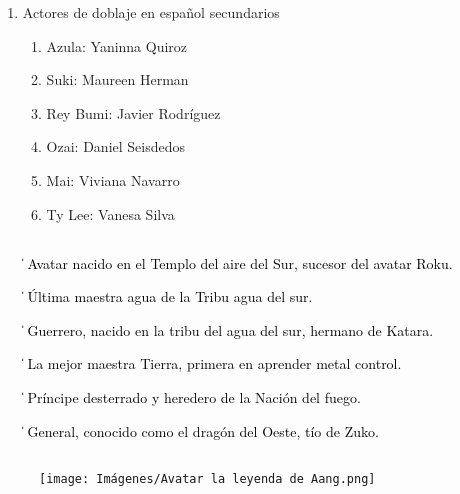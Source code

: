 \documentclass[a5paper,11pt]{article}
\begin{document}
{\begin{enumerate}
\begin{enumerate}
            \end{enumerate}
        \item Actores de doblaje en español secundarios
        \begin{enumerate}
            \item Azula: Yaninna Quiroz
            \item Suki: Maureen Herman
            \item Rey Bumi: Javier Rodríguez
            \item Ozai: Daniel Seisdedos
            \item Mai: Viviana Navarro
            \item Ty Lee: Vanesa Silva
        \end{enumerate}
    \end{enumerate}}
    \subsection*{\sf{\textit{\textcolor{SpringGreen}{Los actores de la isla Ember}}}}
    \textcolor{black}{\begin{itemize}
        \item [\|]  Avatar nacido en el Templo del aire del Sur, sucesor del avatar Roku.
        \item [\|]  Última maestra agua de la Tribu agua del sur.
        \item [\|]  Guerrero, nacido en la tribu del agua del sur, hermano de Katara.
        \item [\|]  La mejor maestra Tierra, primera en aprender metal control.
         \item [\|]  Príncipe desterrado y heredero de la Nación del fuego.
          \item [\|]  General, conocido como el dragón del Oeste, tío de Zuko.
    \end{itemize}}
    
    \subsection*{\sf{\textit{\textcolor{SpringGreen}{Se busca}}}}

    \begin{figure}[h]
        \begin{flushright}
        \caption*{\hspace{2cm}{Avatar la leyenda de Aang}}
        \texttt{[image: Imágenes/Avatar la leyenda de Aang.png]}
        \end{flushright}
    \end{figure}
\end{document}
